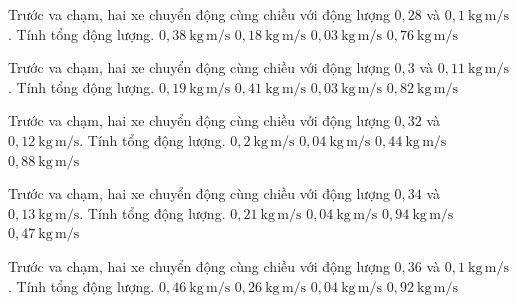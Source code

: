 \begin{ex}
Trước va chạm, hai xe chuyển động cùng chiều với động lượng $0,28$ và $0,1\ \mathrm{kg\,m/s}$. Tính tổng động lượng.
\choice
{\True $0,38\ \mathrm{kg\,m/s}$}
{$0,18\ \mathrm{kg\,m/s}$}
{$0,03\ \mathrm{kg\,m/s}$}
{$0,76\ \mathrm{kg\,m/s}$}
\end{ex}

\begin{ex}
Trước va chạm, hai xe chuyển động cùng chiều với động lượng $0,3$ và $0,11\ \mathrm{kg\,m/s}$. Tính tổng động lượng.
\choice
{$0,19\ \mathrm{kg\,m/s}$}
{\True $0,41\ \mathrm{kg\,m/s}$}
{$0,03\ \mathrm{kg\,m/s}$}
{$0,82\ \mathrm{kg\,m/s}$}
\end{ex}

\begin{ex}
Trước va chạm, hai xe chuyển động cùng chiều với động lượng $0,32$ và $0,12\ \mathrm{kg\,m/s}$. Tính tổng động lượng.
\choice
{$0,2\ \mathrm{kg\,m/s}$}
{$0,04\ \mathrm{kg\,m/s}$}
{\True $0,44\ \mathrm{kg\,m/s}$}
{$0,88\ \mathrm{kg\,m/s}$}
\end{ex}

\begin{ex}
Trước va chạm, hai xe chuyển động cùng chiều với động lượng $0,34$ và $0,13\ \mathrm{kg\,m/s}$. Tính tổng động lượng.
\choice
{$0,21\ \mathrm{kg\,m/s}$}
{$0,04\ \mathrm{kg\,m/s}$}
{$0,94\ \mathrm{kg\,m/s}$}
{\True $0,47\ \mathrm{kg\,m/s}$}
\end{ex}

\begin{ex}
Trước va chạm, hai xe chuyển động cùng chiều với động lượng $0,36$ và $0,1\ \mathrm{kg\,m/s}$. Tính tổng động lượng.
\choice
{\True $0,46\ \mathrm{kg\,m/s}$}
{$0,26\ \mathrm{kg\,m/s}$}
{$0,04\ \mathrm{kg\,m/s}$}
{$0,92\ \mathrm{kg\,m/s}$}
\end{ex}

